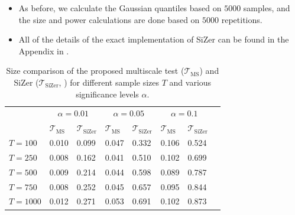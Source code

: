 \documentclass[12pt]{article}
\begin{document}
{\begin{itemize}[label=--,leftmargin=0.45cm,itemsep=0pt]
$$\gamma_{i}(k) = \frac{E[\eta_{it}^2] a^{|k|}}{1 - a^2} = \frac{0.25^{|k|}}{15}.$$

\item As before, we calculate the Gaussian quantiles based on $5000$ samples, and the size and power calculations are done based on $5000$ repetitions.
\item All of the details of the exact implementation of SiZer can be found in the Appendix in \cite{KhismatullinaVogt2020}.

\end{itemize}

\begin{table}[t!]
\footnotesize{
\caption{Size comparison of the proposed multiscale test ($\mathcal{T}_{\text{MS}}$) and SiZer ($\mathcal{T}_{\text{SiZer}}$, \cite{Park2009}) for different sample sizes $T$ and various significance levels $\alpha$.}\label{tab:size:compare}
\begin{tabularx}{\textwidth}{l@{\hskip 20pt} Z@{\hskip 6pt}Z@{\hskip 20pt}Z@{\hskip 6pt}Z@{\hskip 6pt}Z@{\hskip 6pt}Z@{\hskip 20pt}Z}
\toprule
 &  &  & \\
 & $\mathcal{T}_{\text{MS}}$ & $\mathcal{T}_{\text{SiZer}}$   & $\mathcal{T}_{\text{MS}}$ & $\mathcal{T}_{\text{SiZer}}$ & $\mathcal{T}_{\text{MS}}$ & $\mathcal{T}_{\text{SiZer}}$\\
  $T = 100$ & 0.010 & 0.099 & 0.047 & 0.332 & 0.106 & 0.524 \\ 
  $T = 250$ & 0.008 & 0.162 & 0.041 & 0.510 & 0.102 & 0.699 \\ 
  $T = 500$ & 0.009 & 0.214 & 0.044 & 0.598 & 0.089 & 0.787 \\ 
  $T = 750$ & 0.008 & 0.252 & 0.045 & 0.657 & 0.095 & 0.844 \\ 
  $T = 1000$ & 0.012 & 0.271 & 0.053 & 0.691 & 0.102 & 0.873 \\ 
\bottomrule
\end{tabularx}}
\vspace{0.2cm}
\end{table}

}
\end{document}
